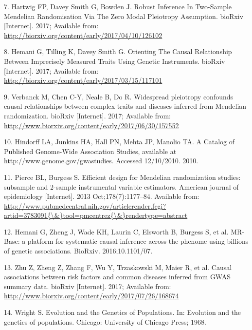 \documentclass[]{article}
\begin{document}
\hypertarget{ref-Hartwig2017}{}
7. Hartwig FP, Davey Smith G, Bowden J. Robust Inference In Two-Sample
Mendelian Randomisation Via The Zero Modal Pleiotropy Assumption.
bioRxiv {[}Internet{]}. 2017; Available from:
\url{http://biorxiv.org/content/early/2017/04/10/126102}

\hypertarget{ref-Hemani2017}{}
8. Hemani G, Tilling K, Davey Smith G. Orienting The Causal Relationship
Between Imprecisely Measured Traits Using Genetic Instruments. bioRxiv
{[}Internet{]}. 2017; Available from:
\url{http://biorxiv.org/content/early/2017/03/15/117101}

\hypertarget{ref-Verbanck2017}{}
9. Verbanck M, Chen C-Y, Neale B, Do R. Widespread pleiotropy confounds
causal relationships between complex traits and diseases inferred from
Mendelian randomization. bioRxiv {[}Internet{]}. 2017; Available from:
\url{http://www.biorxiv.org/content/early/2017/06/30/157552}

\hypertarget{ref-Hindorff2010}{}
10. Hindorff LA, Junkins HA, Hall PN, Mehta JP, Manolio TA. A Catalog of
Published Genome-Wide Association Studies, available at
http://www.genome.gov/gwastudies. Accessed 12/10/2010. 2010.

\hypertarget{ref-Pierce2013}{}
11. Pierce BL, Burgess S. Efficient design for Mendelian randomization
studies: subsample and 2-sample instrumental variable estimators.
American journal of epidemiology {[}Internet{]}. 2013
Oct;178(7):1177--84. Available from:
\href{http://www.pubmedcentral.nih.gov/articlerender.fcgi?artid=3783091\%7B/\&\%7Dtool=pmcentrez\%7B/\&\%7Drendertype=abstract}{http://www.pubmedcentral.nih.gov/articlerender.fcgi?artid=3783091\{\textbackslash{}\&\}tool=pmcentrez\{\textbackslash{}\&\}rendertype=abstract}

\hypertarget{ref-Hemani2016}{}
12. Hemani G, Zheng J, Wade KH, Laurin C, Elsworth B, Burgess S, et al.
MR-Base: a platform for systematic causal inference across the phenome
using billions of genetic associations. BioRxiv. 2016;10.1101/07.

\hypertarget{ref-Zhu2017}{}
13. Zhu Z, Zheng Z, Zhang F, Wu Y, Trzaskowski M, Maier R, et al. Causal
associations between risk factors and common diseases inferred from GWAS
summary data. bioRxiv {[}Internet{]}. 2017; Available from:
\url{http://www.biorxiv.org/content/early/2017/07/26/168674}

\hypertarget{ref-Wright1968}{}
14. Wright S. Evolution and the Genetics of Populations. In: Evolution
and the genetics of populations. Chicago: University of Chicago Press;
1968.
\end{document}
